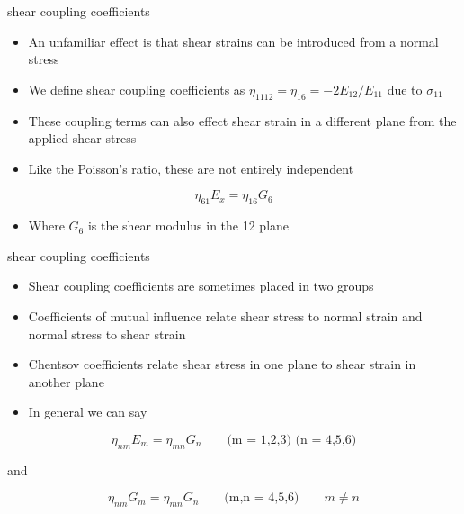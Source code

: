 \documentclass[
  letterpaper,
  ignorenonframetext,
  aspectratio=43,
  handout,
  12pt]{beamer}
\providecommand{\tightlist}{%
  \setlength{\itemsep}{0pt}\setlength{\parskip}{0pt}}
\providecommand{\tightlist}{%
\setlength{\itemsep}{0pt}\setlength{\parskip}{0pt}}
\begin{document}
\begin{frame}{shear coupling coefficients}
\protect\hypertarget{shear-coupling-coefficients}{}
\begin{itemize}
\tightlist
\item
  An unfamiliar effect is that shear strains can be introduced from a
  normal stress
\item
  We define shear coupling coefficients as
  \(\eta_{1112} = \eta_{16} = -2E_{12}/E_{11}\) due to \(\sigma_{11}\)
\item
  These coupling terms can also effect shear strain in a different plane
  from the applied shear stress
\item
  Like the Poisson's ratio, these are not entirely independent
\end{itemize}

\[ \eta_{61} E_x = \eta_{16} G_6 \]

\begin{itemize}
\tightlist
\item
  Where \(G_6\) is the shear modulus in the 12 plane
\end{itemize}
\end{frame}

\begin{frame}{shear coupling coefficients}
\protect\hypertarget{shear-coupling-coefficients-1}{}
\begin{itemize}
\tightlist
\item
  Shear coupling coefficients are sometimes placed in two groups
\item
  Coefficients of mutual influence relate shear stress to normal strain
  and normal stress to shear strain
\item
  Chentsov coefficients relate shear stress in one plane to shear strain
  in another plane
\item
  In general we can say
\end{itemize}

\[\eta_{nm} E_m = \eta_{mn} G_n \qquad \text{(m = 1,2,3) (n = 4,5,6)} \]

and

\[\eta_{nm} G_m = \eta_{mn} G_n \qquad \text{(m,n = 4,5,6)} \qquad m \ne n \]
\end{frame}
\end{document}
